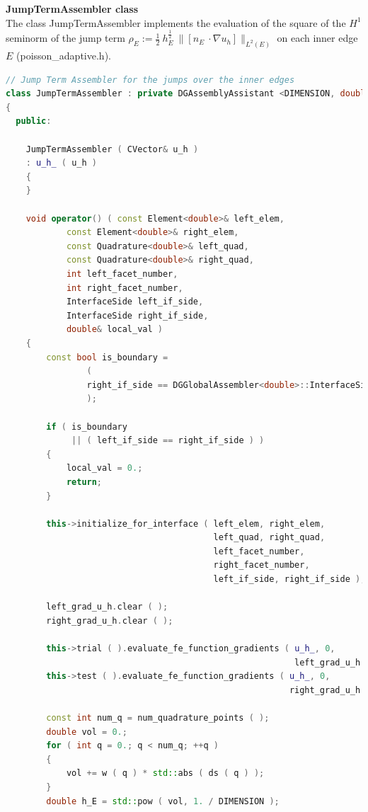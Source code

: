 \documentclass[a4paper, 11pt, twoside]{article}
\begin{document}
\textbf{JumpTermAssembler class}\\
The class JumpTermAssembler implements the evaluation of the square of the $H^1$ seminorm 
of the jump term $\rho_{E} :=\frac{1}{2}\ h_E^{\frac{1}{2}}\ \|[n_{E}\ \cdot \nabla u_h]\|_{L^2(E)}$ on each inner edge $E$ (poisson\_adaptive.h).

\begin{lstlisting}[language=C++, basicstyle={\footnotesize, \ttfamily}, keywordstyle=\color{blue}, numbers=none, tabsize=4]
// Jump Term Assembler for the jumps over the inner edges
class JumpTermAssembler : private DGAssemblyAssistant <DIMENSION, double>
{
  public:

    JumpTermAssembler ( CVector& u_h )
    : u_h_ ( u_h )
    {
    }

    void operator() ( const Element<double>& left_elem,
            const Element<double>& right_elem,
            const Quadrature<double>& left_quad,
            const Quadrature<double>& right_quad,
            int left_facet_number,
            int right_facet_number,
            InterfaceSide left_if_side,
            InterfaceSide right_if_side,
            double& local_val )
    {
        const bool is_boundary =
                (
                right_if_side == DGGlobalAssembler<double>::InterfaceSide::BOUNDARY
                );

        if ( is_boundary
             || ( left_if_side == right_if_side ) )
        {
            local_val = 0.;
            return;
        }

        this->initialize_for_interface ( left_elem, right_elem,
                                         left_quad, right_quad,
                                         left_facet_number, 
                                         right_facet_number,
                                         left_if_side, right_if_side );

        left_grad_u_h.clear ( );
        right_grad_u_h.clear ( );

        this->trial ( ).evaluate_fe_function_gradients ( u_h_, 0,
                                                         left_grad_u_h );
        this->test ( ).evaluate_fe_function_gradients ( u_h_, 0, 
                                                        right_grad_u_h );

        const int num_q = num_quadrature_points ( );
        double vol = 0.;
        for ( int q = 0.; q < num_q; ++q )
        {
            vol += w ( q ) * std::abs ( ds ( q ) );
        }
        double h_E = std::pow ( vol, 1. / DIMENSION );


\end{lstlisting}
\end{document}
